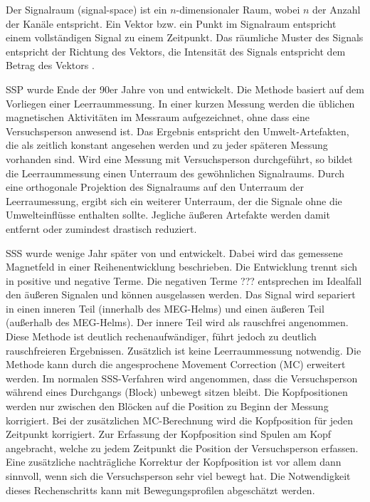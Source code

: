 \documentclass[doc,a4paper,12pt]{apa6}
\begin{document}
Der Signalraum (signal-space) ist ein $n$-dimensionaler Raum, wobei $n$ der Anzahl der Kanäle entspricht. Ein Vektor bzw. ein Punkt im Signalraum entspricht einem vollständigen Signal zu einem Zeitpunkt. Das räumliche Muster des Signals entspricht der Richtung des Vektors, die Intensität des Signals entspricht dem Betrag des Vektors \parencite{hansen2010meg}.

SSP wurde Ende der 90er Jahre von \textcite{uusitalo1997signal} und \textcite{parkkonen1999interference} entwickelt. Die Methode basiert auf dem Vorliegen einer Leerraummessung. In einer kurzen Messung werden die üblichen magnetischen Aktivitäten im Messraum aufgezeichnet, ohne dass eine Versuchsperson anwesend ist. Das Ergebnis entspricht den Umwelt-Artefakten, die als zeitlich konstant angesehen werden und zu jeder späteren Messung vorhanden sind. Wird eine Messung mit Versuchsperson durchgeführt, so bildet die Leerraummessung einen Unterraum des gewöhnlichen Signalraums. Durch eine orthogonale Projektion des Signalraums auf den Unterraum der Leerraumessung, ergibt sich ein weiterer Unterraum, der die Signale ohne die Umwelteinflüsse enthalten sollte. Jegliche äußeren Artefakte werden damit entfernt oder zumindest drastisch reduziert.

SSS wurde wenige Jahr später von \textcite{taulu2004suppression} und \textcite{taulu2005presentation} entwickelt. Dabei wird das gemessene Magnetfeld in einer Reihenentwicklung beschrieben. Die Entwicklung trennt sich in positive und negative Terme. Die negativen Terme ??? entsprechen im Idealfall den äußeren Signalen und können ausgelassen werden. Das Signal wird separiert in einen inneren Teil (innerhalb des MEG-Helms) und einen äußeren Teil (außerhalb des MEG-Helms). Der innere Teil wird als rauschfrei angenommen. Diese Methode ist deutlich rechenaufwändiger, führt jedoch zu deutlich rauschfreieren Ergebnissen. Zusätzlich ist keine Leerraummessung notwendig. Die Methode kann durch die angesprochene Movement Correction (MC) erweitert werden. Im normalen SSS-Verfahren wird angenommen, dass die Versuchsperson während eines Durchgangs (Block) unbewegt sitzen bleibt. Die Kopfpositionen werden nur zwischen den Blöcken auf die Position zu Beginn der Messung korrigiert. Bei der zusätzlichen MC-Berechnung wird die Kopfposition für jeden Zeitpunkt korrigiert. Zur Erfassung der Kopfposition sind Spulen am Kopf angebracht, welche zu jedem Zeitpunkt die Position der Versuchsperson erfassen. Eine zusätzliche nachträgliche Korrektur der Kopfposition ist vor allem dann sinnvoll, wenn sich die Versuchsperson sehr viel bewegt hat. Die Notwendigkeit dieses Rechenschritts kann mit Bewegungsprofilen abgeschätzt werden.
\end{document}
